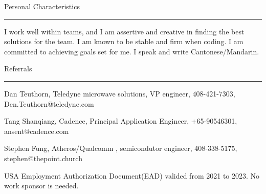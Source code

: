 { \medbreak } { \FFbg
Personal Characteristics
}
{ \smallbreak } {\par\noindent\hrule} { \smallbreak }
I work well within teams, and I am assertive and creative
    in finding the best solutions for the team.
I am known to be stable and firm when coding.
I am committed to achieving goals set for me.
I speak and write
Cantonese/Mandarin.

{ \medbreak } { \FFbg
Referrals
}
{ \smallbreak } {\par\noindent\hrule} { \smallbreak }

Dan Teuthorn, 
Teledyne microwave solutions, VP engineer,
408-421-7303,
Den.Teuthorn@teledyne.com

Tang Shanqiang,
Cadence,
Principal Application Engineer,
+65-90546301,
ansent@cadence.com

Stephen Fung,
Atheros/Qualcomm , semicondutor engineer,
408-338-5175,
stephen@thepoint.church



{ \medbreak } 
{ %
USA Employment Authorization Document(EAD) valided from 2021 to 2023.
No work sponsor is needed.
}

\break

\bye
